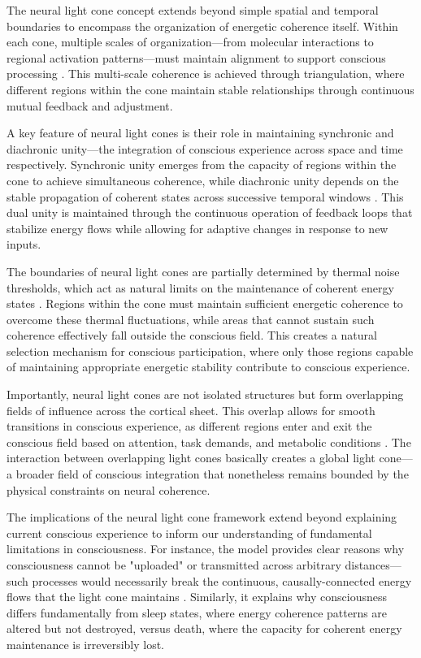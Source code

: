 \begin{refsection}
The neural light cone concept extends beyond simple spatial and temporal boundaries to encompass the organization of energetic coherence itself. Within each cone, multiple scales of organization—from molecular interactions to regional activation patterns—must maintain alignment to support conscious processing \cite{vazquez2019gradients}. This multi-scale coherence is achieved through triangulation, where different regions within the cone maintain stable relationships through continuous mutual feedback and adjustment.

A key feature of neural light cones is their role in maintaining synchronic and diachronic unity—the integration of conscious experience across space and time respectively. Synchronic unity emerges from the capacity of regions within the cone to achieve simultaneous coherence, while diachronic unity depends on the stable propagation of coherent states across successive temporal windows \cite{tegmark2016improved}. This dual unity is maintained through the continuous operation of feedback loops that stabilize energy flows while allowing for adaptive changes in response to new inputs.

The boundaries of neural light cones are partially determined by thermal noise thresholds, which act as natural limits on the maintenance of coherent energy states \cite{oyama2009noise}. Regions within the cone must maintain sufficient energetic coherence to overcome these thermal fluctuations, while areas that cannot sustain such coherence effectively fall outside the conscious field. This creates a natural selection mechanism for conscious participation, where only those regions capable of maintaining appropriate energetic stability contribute to conscious experience.

Importantly, neural light cones are not isolated structures but form overlapping fields of influence across the cortical sheet. This overlap allows for smooth transitions in conscious experience, as different regions enter and exit the conscious field based on attention, task demands, and metabolic conditions \cite{petermann2009spontaneous}. The interaction between overlapping light cones basically creates a global light cone—a broader field of conscious integration that nonetheless remains bounded by the physical constraints on neural coherence.

The implications of the neural light cone framework extend beyond explaining current conscious experience to inform our understanding of fundamental limitations in consciousness. For instance, the model provides clear reasons why consciousness cannot be "uploaded" or transmitted across arbitrary distances—such processes would necessarily break the continuous, causally-connected energy flows that the light cone maintains \cite{seth2015granger}. Similarly, it explains why consciousness differs fundamentally from sleep states, where energy coherence patterns are altered but not destroyed, versus death, where the capacity for coherent energy maintenance is irreversibly lost.


\end{refsection}
